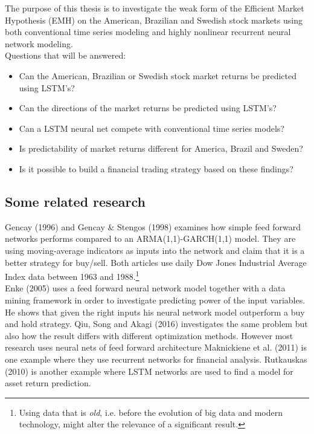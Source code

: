 \documentclass[12pt, letterpaper]{amsart}%
\begin{document}
The purpose of this thesis is to investigate the weak form of the Efficient Market Hypothesis (EMH) on the American, Brazilian and Swedish stock markets using both conventional time series modeling and highly nonlinear recurrent neural network modeling.
\\

Questions that will be answered:

\begin{itemize}
\item Can the American, Brazilian or Swedish stock market returns be predicted using LSTM's?
\item Can the directions of the market returns be predicted using LSTM's?
\item Can a LSTM neural net compete with conventional time series models?
\item Is predictability of market returns different for America, Brazil and Sweden?
\item Is it possible to build a financial trading strategy based on these findings?
\end{itemize}

\subsection{Some related research}
Gencay (1996) and Gencay \& Stengos (1998) examines how simple feed forward networks performs compared to an ARMA(1,1)-GARCH(1,1) model. They are using moving-average indicators as inputs into the network and claim that it is a better strategy for buy/sell. Both articles use daily Dow Jones Industrial Average Index data between 1963 and 1988.\footnote{Using data that is \textit{old}, i.e. before the evolution of big data and modern technology, might alter the relevance of a significant result.}
\\

Enke (2005) uses a feed forward neural network model together with a data mining framework in order to investigate predicting power of the input variables. He shows that given the right inputs his neural network model outperform a buy and hold strategy. Qiu, Song and Akagi (2016) investigates the same problem but also how the result differs with different optimization methods. However most research uses neural nets of feed forward architecture Maknickiene et al. (2011) is one example where they use recurrent networks for financial analysis. Rutkauskas (2010) is another example where LSTM networks are used to find a model for asset return prediction.
\\
\end{document}
